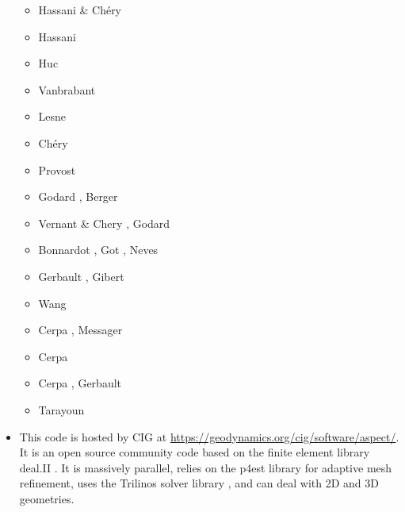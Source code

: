 \begin{itemize}
\begin{scriptsize}
\begin{itemize}
\item[\nineteenninetysix] Hassani \& Ch\'ery \cite{hach96b}
\item[\nineteenninetyseven] Hassani \etal\cite{hajc97}
\item[\nineteenninetyeight] Huc \etal \cite{huhc98}
\item[\nineteenninetynine] Vanbrabant \etal \cite{vajh99}
\item[\twothousand] Lesne \etal \cite{lecd00}
\item[\twothousandone] Ch\'ery \etal \cite{chzh01}
\item[\twothousandthree] Provost \etal \cite{prch03}
\item[\twothousandfour] Godard \etal \cite{gocl04}, Berger \etal \cite{bejh04}
\item[\twothousandsix] Vernant \& Chery \cite{vech06}, Godard \etal \cite{golc06}
\item[\twothousandeight] Bonnardot \etal \cite{boht08a,boht08b}, Got \etal \cite{gomm08},
                         Neves \etal \cite{netv08}
\item[\twothousandtwelve] Gerbault \etal \cite{gech12}, Gibert \etal \cite{gigh12}
\item[\twothousandthirteen] Wang \etal \cite{wahd13}
\item[\twothousandfourteen] Cerpa \etal \cite{cehg14}, Messager \etal \cite{mehn14}
\item[\twothousandfifteen] Cerpa \etal \cite{ceag15}
\item[\twothousandeighteen] Cerpa \etal \cite{cegm18}, Gerbault \etal \cite{gehn18}
\item[\twothousandnineteen] Tarayoun \etal \cite{tamg19}
\end{itemize}
\end{scriptsize}

\item \aspect {}

This code is hosted by CIG at \url{https://geodynamics.org/cig/software/aspect/}. 
It is an open source community code based on the finite element library deal.II \cite{bahk07,arbc19,arbd20}. 
It is massively parallel, relies on the p4est library for adaptive mesh refinement,
uses the Trilinos solver library \cite{hewi12}, and can deal with 2D and 3D geometries. 


\end{itemize}
